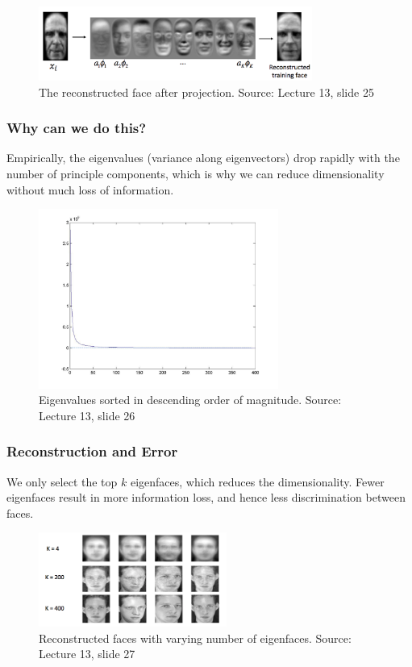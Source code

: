\documentclass{article}
\begin{document}
\begin{figure}[h]
  \centering
  \includegraphics[width=0.8\textwidth]{reconstructed}
  \caption{The reconstructed face after projection. Source: Lecture 13, slide 25}
\end{figure}

\subsubsection{Why can we do this?}
Empirically, the eigenvalues (variance along eigenvectors) drop rapidly with the number of principle components, which is why we can reduce dimensionality without much loss of information.

\begin{figure}[h]
  \centering
  \includegraphics[width=0.7\textwidth]{eigenvalues}
  \caption{Eigenvalues sorted in descending order of magnitude. Source: Lecture 13, slide 26}
\end{figure}

\subsubsection{Reconstruction and Error}
We only select the top $k$ eigenfaces, which reduces the dimensionality. Fewer eigenfaces result in more information loss, and hence less discrimination between faces.

\begin{figure}[h]
  \centering
  \includegraphics[width=0.55\textwidth]{error}
  \caption{Reconstructed faces with varying number of eigenfaces. Source: Lecture 13, slide 27}
\end{figure}
\end{document}

